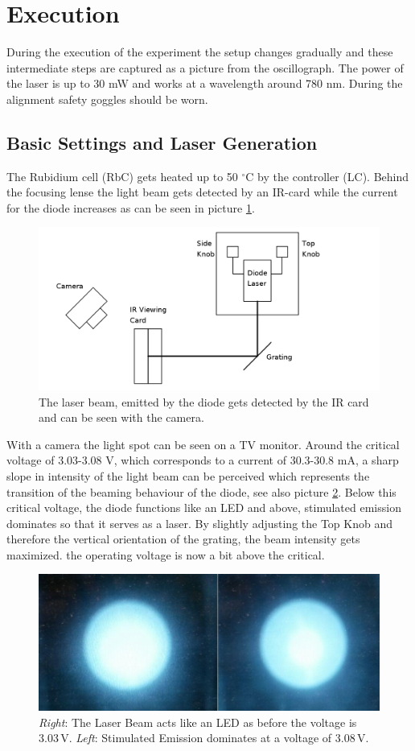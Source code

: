 \section{Execution}
During the execution of the experiment the setup changes gradually and these intermediate steps are captured as a picture from the oscillograph. The power
of the laser is up to 30 mW and works at a wavelength around 780 nm. During the alignment safety goggles should be worn.
\subsection{Basic Settings and Laser Generation}
The Rubidium cell (RbC) gets heated up to 50 $^\circ$C by the controller (LC). Behind the focusing lense the light beam gets detected by an IR-card while
the current for the diode increases as can be seen in picture \ref{pic_setup1}. 
\begin{figure}[t]
 \includegraphics[width=\textwidth]{../pics/setup1.png}
 \caption{The laser beam, emitted by the diode gets detected by the IR card and can be seen with the camera.}
 \label{pic_setup1}
\end{figure}
With a camera the light spot can be seen on a TV monitor. Around the critical
voltage of 3.03-3.08 V, which corresponds to a current of 30.3-30.8 mA, a sharp slope in intensity of the light beam can be perceived which represents the transition of the beaming behaviour of the diode,
see also picture \ref{pic_stains}.
Below this critical voltage, the diode functions like an LED and above, stimulated emission dominates so that it serves as a laser. By slightly adjusting
the Top Knob and therefore the vertical orientation of the grating, the beam intensity gets maximized. the operating voltage is now a bit above the critical.
\begin{figure}
 \includegraphics[width=\textwidth]{../pics/stains.jpg}
 \caption{\textit{Right}: The Laser Beam acts like an LED as before the voltage is 3.03\,V. \textit{Left}: Stimulated Emission dominates at a voltage of
 3.08\,V.}
 \label{pic_stains}
\end{figure}


